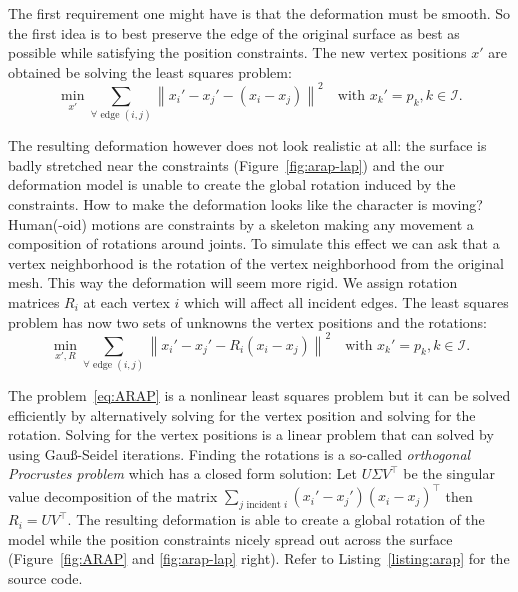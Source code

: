 \documentclass[notitlepage,oneside]{book}
\begin{document}
The first requirement one might have is that the deformation must be smooth. So the first idea is to best preserve the edge of the original surface as best as possible while satisfying the position constraints. The new vertex positions $x'$ are obtained be solving the least squares problem:
\begin{equation}
 \min_{x'} \sum_{\forall \text{ edge } (i,j)} \left\| x_i' - x_j'- (x_i - x_j) \right\|^2 \quad \text{with } x_k' = p_k , k \in \mathcal{I} .
\label{eq:ARAP_lap}
\end{equation}

The resulting deformation however does not look realistic at all: the surface is badly stretched near the constraints (Figure~\ref{fig:arap-lap}) and the our deformation model is unable to create the global rotation induced by the constraints. How to make the deformation looks like the character is moving? Human(-oid) motions are constraints by a skeleton making any movement a composition of rotations around joints. To simulate this effect we can ask that a vertex neighborhood is the rotation of the vertex neighborhood from the original mesh. This way the deformation will seem more rigid. We assign rotation matrices $R_i$ at each vertex $i$ which will affect all incident edges. The least squares problem has now two sets of unknowns the vertex positions and the rotations:
\begin{equation}
 \min_{x', R} \sum_{\forall \text{ edge } (i,j)} \left\| x_i' - x_j'- R_i (x_i - x_j) \right\|^2 \quad \text{with } x_k' = p_k , k \in \mathcal{I}.
\label{eq:ARAP}
\end{equation}

The problem~\eqref{eq:ARAP} is a nonlinear least squares problem but it can be solved efficiently by alternatively solving for the vertex position and solving for the rotation.
Solving for the vertex positions is a linear problem that can solved by using Gau\ss-Seidel iterations.
Finding the rotations is a so-called \textit{orthogonal Procrustes problem} which has a closed form solution: Let $U \Sigma V^\top$ be the singular value decomposition of the matrix $\sum_{j\text{ incident }i} (x_i' - x_j')(x_i - x_j)^\top$ then $R_i = U V^\top$. 
The resulting deformation is able to create a global rotation of the model while the position constraints  nicely spread out across the surface (Figure~\ref{fig:ARAP} and \ref{fig:arap-lap} right).
Refer to Listing~\ref{listing:arap} for the source code.
\end{document}
